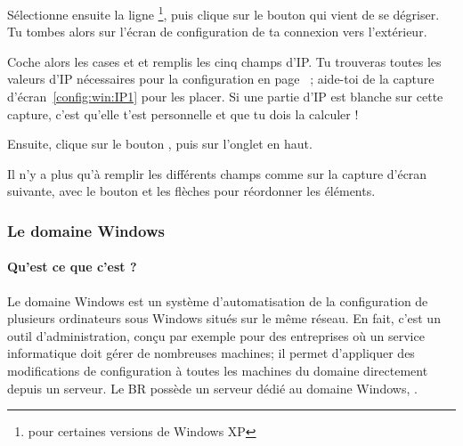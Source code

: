 


S\'electionne ensuite la ligne 
\footnote{ pour certaines versions de Windows XP},
puis clique sur le bouton  qui vient de se
d\'egriser. Tu tombes alors sur l'\'ecran de configuration de ta
connexion vers l'ext\'erieur.

Coche alors les cases  et  et remplis les cinq champs d'IP. Tu
trouveras toutes les valeurs d'IP n\'ecessaires pour la configuration en page~\pageref{tableau:mon_IP} ; aide-toi de la capture
d'\'ecran~\ref{config:win:IP1} pour les placer. Si une partie d'IP est blanche sur cette capture, c'est qu'elle t'est personnelle et que tu dois la
calculer !

Ensuite, clique sur le bouton , puis sur l'onglet
 en haut.


Il n'y a plus qu'\`a remplir les diff\'erents champs comme sur la
capture d'\'ecran suivante, avec le bouton  et les
fl\`eches pour r\'eordonner les \'el\'ements.


\subsubsection{Le domaine Windows}

\paragraph{Qu'est ce que c'est ?}
Le domaine Windows est un syst\`eme d'automatisation de la
configuration de plusieurs ordinateurs sous Windows situ\'es sur le
m\^eme r\'eseau. En fait, c'est un outil d'administration, con\c{c}u par
exemple pour des entreprises o\`u un service informatique doit g\'erer
de nombreuses machines; il permet d'appliquer des modifications de
configuration \`a toutes les machines du domaine directement depuis un
serveur. Le BR poss\`ede un serveur d\'edi\'e au domaine Windows,
.


